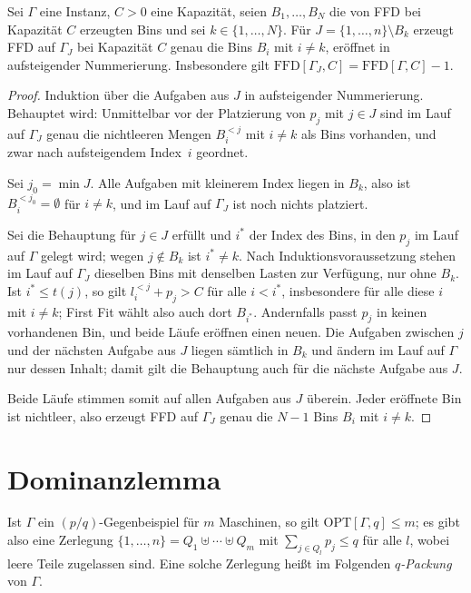 \begin{lemma}
\label{lem:loesch}
Sei $\Gamma$ eine Instanz, $C > 0$ eine Kapazität, seien $B_1, \ldots, B_N$ die von FFD bei
Kapazität $C$ erzeugten Bins und sei $k \in \{1, \ldots, N\}$.
Für $J = \{1, \ldots, n\} \setminus B_k$ erzeugt FFD auf $\Gamma_J$ bei Kapazität $C$ genau die
Bins $B_i$ mit $i \ne k$, eröffnet in aufsteigender Nummerierung.
Insbesondere gilt $\mathrm{FFD}[\Gamma_J, C] = \mathrm{FFD}[\Gamma, C] - 1$.
\end{lemma}

\begin{proof}
Induktion über die Aufgaben aus $J$ in aufsteigender Nummerierung.
Behauptet wird: Unmittelbar vor der Platzierung von $p_j$ mit $j \in J$ sind im Lauf auf
$\Gamma_J$ genau die nichtleeren Mengen $B_i^{<j}$ mit $i \ne k$ als Bins vorhanden, und zwar
nach aufsteigendem Index~$i$ geordnet.

Sei $j_0 = \min J$. Alle Aufgaben mit kleinerem Index liegen in $B_k$, also ist $B_i^{<j_0} =
\emptyset$ für $i \ne k$, und im Lauf auf $\Gamma_J$ ist noch nichts platziert.

Sei die Behauptung für $j \in J$ erfüllt und $i^{*}$ der Index des Bins, in den $p_j$ im Lauf auf
$\Gamma$ gelegt wird; wegen $j \notin B_k$ ist $i^{*} \ne k$.
Nach Induktionsvoraussetzung stehen im Lauf auf $\Gamma_J$ dieselben Bins mit denselben Lasten
zur Verfügung, nur ohne $B_k$.
Ist $i^{*} \le t(j)$, so gilt $l_i^{<j} + p_j > C$ für alle $i < i^{*}$, insbesondere für alle
diese $i$ mit $i \ne k$; First Fit wählt also auch dort $B_{i^{*}}$.
Andernfalls passt $p_j$ in keinen vorhandenen Bin, und beide Läufe eröffnen einen neuen.
Die Aufgaben zwischen $j$ und der nächsten Aufgabe aus $J$ liegen sämtlich in $B_k$ und ändern im
Lauf auf $\Gamma$ nur dessen Inhalt; damit gilt die Behauptung auch für die nächste Aufgabe aus
$J$.

Beide Läufe stimmen somit auf allen Aufgaben aus $J$ überein.
Jeder eröffnete Bin ist nichtleer, also erzeugt FFD auf $\Gamma_J$ genau die $N-1$ Bins $B_i$ mit
$i \ne k$.
\end{proof}

\section{Dominanzlemma}
\label{sec:dominanz}

Ist $\Gamma$ ein $(p/q)$-Gegenbeispiel für $m$ Maschinen, so gilt $\mathrm{OPT}[\Gamma, q] \le m$;
es gibt also eine Zerlegung $\{1, \ldots, n\} = Q_1 \uplus \cdots \uplus Q_m$ mit
$\sum_{j \in Q_l} p_j \le q$ für alle $l$, wobei leere Teile zugelassen sind.
Eine solche Zerlegung heißt im Folgenden \emph{$q$-Packung} von $\Gamma$.

